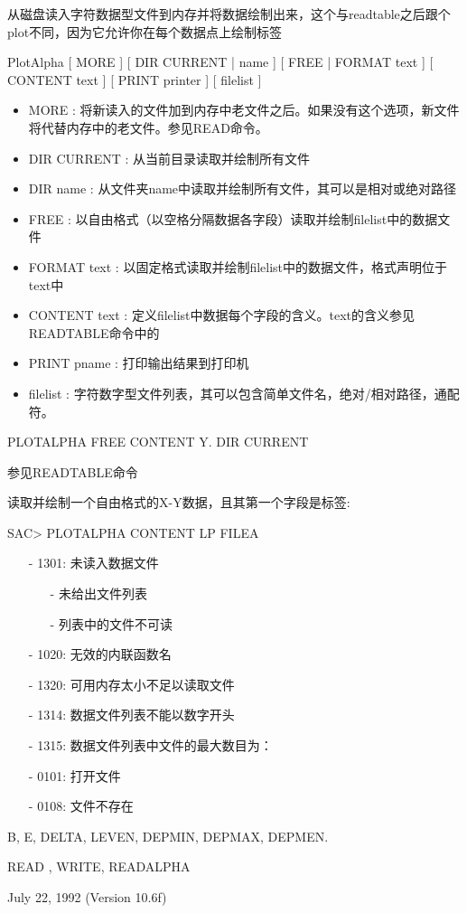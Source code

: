 \label{cmd:plotalpha}

从磁盘读入字符数据型文件到内存并将数据绘制出来，这个与readtable之后跟个plot不同，因为它允许你在每个数据点上绘制标签

PlotAlpha [ MORE ] [ DIR CURRENT | name ] [ FREE | FORMAT text ] [ CONTENT text ] [ PRINT printer ] [ filelist ]

\begin{itemize}
\item MORE : 将新读入的文件加到内存中老文件之后。如果没有这个选项，新文件将代替内存中的老文件。参见READ命令。
\item DIR CURRENT : 从当前目录读取并绘制所有文件 
\item DIR name : 从文件夹name中读取并绘制所有文件，其可以是相对或绝对路径 
\item FREE : 以自由格式（以空格分隔数据各字段）读取并绘制filelist中的数据文件 
\item FORMAT text : 以固定格式读取并绘制filelist中的数据文件，格式声明位于text中 
\item CONTENT text : 定义filelist中数据每个字段的含义。text的含义参见READTABLE命令中的 
\item PRINT pname : 打印输出结果到打印机 
\item filelist : 字符数字型文件列表，其可以包含简单文件名，绝对/相对路径，通配符。 
\end{itemize}

PLOTALPHA FREE CONTENT Y. DIR CURRENT

参见READTABLE命令

读取并绘制一个自由格式的X-Y数据，且其第一个字段是标签:
\begin{SACCode}
SAC> PLOTALPHA CONTENT LP FILEA
\end{SACCode}

\begin{itemize}
\item[-]1301: 未读入数据文件
	\begin{itemize}
	\item[-]未给出文件列表
	\item[-]列表中的文件不可读
	\end{itemize}
\item[-]1020: 无效的内联函数名
\item[-]1320: 可用内存太小不足以读取文件
\item[-]1314: 数据文件列表不能以数字开头
\item[-]1315: 数据文件列表中文件的最大数目为：
\end{itemize}

\begin{itemize}
\item[-]0101: 打开文件
\item[-]0108: 文件不存在
\end{itemize}

B, E, DELTA, LEVEN, DEPMIN, DEPMAX, DEPMEN.

READ , WRITE, READALPHA

July 22, 1992 (Version 10.6f)
